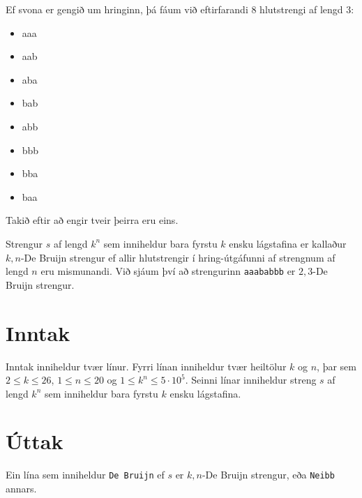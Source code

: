 Ef svona er gengið um hringinn, þá fáum við eftirfarandi $8$ hlutstrengi af
lengd $3$:
\begin{itemize}
    \item aaa
    \item aab
    \item aba
    \item bab
    \item abb
    \item bbb
    \item bba
    \item baa
\end{itemize}

Takið eftir að engir tveir þeirra eru eins.

Strengur $s$ af lengd $k^n$ sem inniheldur bara fyrstu $k$ ensku lágstafina er
kallaður $k,n$-De Bruijn strengur ef allir hlutstrengir í hring-útgáfunni af
strengnum af lengd $n$ eru mismunandi. Við sjáum því að strengurinn
\texttt{aaababbb} er $2,3$-De Bruijn strengur.

\section*{Inntak}
Inntak inniheldur tvær línur. Fyrri línan inniheldur tvær heiltölur $k$ og $n$,
þar sem $2 \leq k \leq 26$, $1 \leq n \leq 20$ og $1 \leq k^n \leq 5 \cdot
10^5$. Seinni línar inniheldur streng $s$ af lengd $k^n$ sem inniheldur bara
fyrstu $k$ ensku lágstafina.

\section*{Úttak}
Ein lína sem inniheldur \texttt{De Bruijn} ef $s$ er $k,n$-De Bruijn strengur,
eða \texttt{Neibb} annars.

